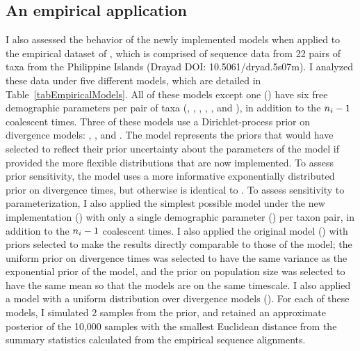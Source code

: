 \subsection{An empirical application}
I also assessed the behavior of the newly implemented models when applied to
the empirical dataset of \cite{Oaks2012}, which is comprised of sequence data
from 22 pairs of taxa from the Philippine Islands (Drayad DOI:
10.5061/dryad.5s07m).
I analyzed these data under five different models, which are detailed in
Table~\ref{tabEmpiricalModels}.
All of these models except one (\empModelDPPSimple) have six free demographic
parameters per pair of taxa (\ancestralTheta{},
,
,
\bottleTime{},
, and
),
in addition to the $\popSampleSize{i}{} - 1$ coalescent times.
Three of these models use a Dirichlet-process prior on divergence models:
\empModelDPP, \empModelDPPInform, and \empModelDPPSimple.
The \empModelDPP model represents the priors that \cite{Oaks2012} would have
selected to reflect their prior uncertainty about the parameters of the model
if provided the more flexible distributions that are now implemented.
To assess prior sensitivity, the \empModelDPPInform model uses a more
informative exponentially distributed prior on divergence times, but otherwise
is identical to \empModelDPP.
To assess sensitivity to parameterization, I also applied the simplest
possible model under the new implementation (\empModelDPPSimple) with only a
single demographic parameter (\myTheta{}) per taxon pair, in addition to the
$\popSampleSize{i}{} - 1$ coalescent times.
I also applied the original \msb model (\empModelOld) with priors selected to
make the results directly comparable to those of the \empModelDPP model;
the uniform prior on divergence times was selected to have the same variance as
the exponential prior of the \empModelDPP model, and the prior on population
size was selected to have the same mean so that the models are on the same
timescale.
I also applied a model with a uniform distribution over divergence models
(\empModelUniform).
For each of these models, I simulated 2 samples from the prior, and
retained an approximate posterior of the 10,000 samples with the smallest
Euclidean distance from the summary statistics calculated from the empirical
sequence alignments.

